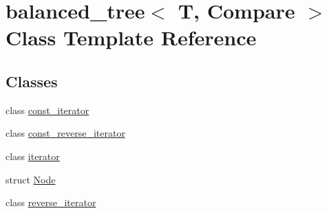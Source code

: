\hypertarget{classbalanced__tree}{\section{balanced\+\_\+tree$<$ T, Compare $>$ Class Template Reference}
\label{classbalanced__tree}
}
\subsection*{Classes}
\begin{DoxyCompactItemize}
\item 
class \hyperlink{classbalanced__tree_1_1const__iterator}{const\+\_\+iterator}
\item 
class \hyperlink{classbalanced__tree_1_1const__reverse__iterator}{const\+\_\+reverse\+\_\+iterator}
\item 
class \hyperlink{classbalanced__tree_1_1iterator}{iterator}
\item 
struct \hyperlink{structbalanced__tree_1_1Node}{Node}
\item 
class \hyperlink{classbalanced__tree_1_1reverse__iterator}{reverse\+\_\+iterator}
\end{DoxyCompactItemize}
